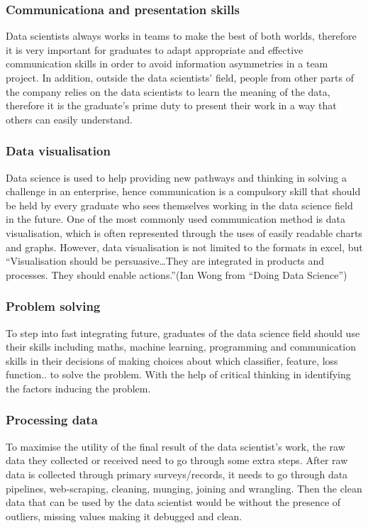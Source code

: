 \documentclass[a4paper, 11pt]{report}
\begin{document}
\subsubsection{Communicationa and presentation skills}
Data scientists always works in teams to make the best of both worlds, therefore it is very important for graduates to adapt appropriate and effective communication skills in order to avoid information asymmetries in a team project. In addition, outside the data scientists’ field, people from other parts of the company relies on the data scientists to learn the meaning of the data, therefore it is the graduate’s prime duty to present their work in a way that others can easily understand. 

\subsubsection{Data visualisation}
Data science is used to help providing new pathways and thinking in solving a challenge in an enterprise, hence communication is a compulsory skill that should be held by every graduate who sees themselves working in the data science field in the future. One of the most commonly used communication method is data visualisation, which is often represented through the uses of easily readable charts and graphs. However, data visualisation is not limited to the formats in excel, but “Visualisation should be persuasive…They are integrated in products and processes. They should enable actions.”(Ian Wong from “Doing Data Science”)

\subsubsection{Problem solving}
To step into fast integrating future, graduates of the data science field should use their skills including maths, machine learning, programming and communication skills in their decisions of making choices about which classifier, feature, loss function..\cite{o2013doing} to solve the problem. With the help of critical thinking in identifying the factors inducing the problem.

\subsubsection{Processing data}
To maximise the utility of the final result of the data scientist’s work, the raw data they collected or received need to go through some extra steps. After raw data is collected through primary surveys/records, it needs to go through data pipelines, web-scraping, cleaning, munging, joining and wrangling. Then the clean data that can be used by the data scientist would be without the presence of outliers, missing values making it debugged and clean. 
\end{document}
